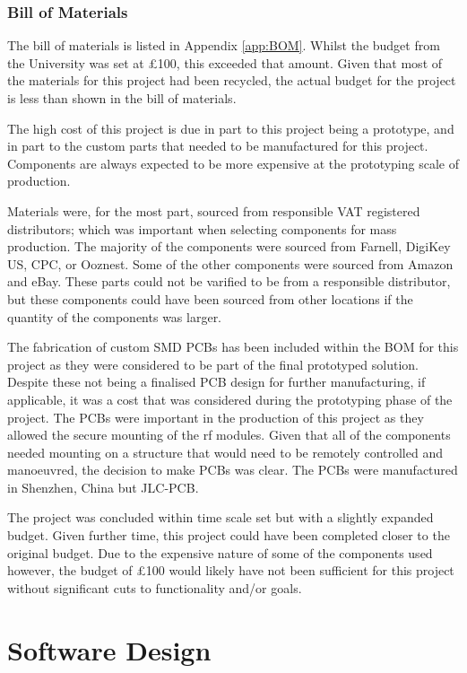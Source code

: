 \documentclass [11pt]{article}
\begin{document}
\subsubsection{Bill of Materials}

The bill of materials is listed in Appendix \ref{app:BOM}. Whilst the budget from the University was set at £100, this exceeded that amount. Given that most of the materials for this project had been recycled, the actual budget for the project is less than shown in the bill of materials.

The high cost of this project is due in part to this project being a prototype, and in part to the custom parts that needed to be manufactured for this project. Components are always expected to be more expensive at the prototyping scale of production.

Materials were, for the most part, sourced from responsible VAT registered distributors; which was important when selecting components for mass production. The majority of the components were sourced from Farnell, DigiKey US, CPC, or Ooznest. Some of the other components were sourced from Amazon and eBay. These parts could not be varified to be from a responsible distributor, but these components could have been sourced from other locations if the quantity of the components was larger. 

The fabrication of custom SMD PCBs has been included within the BOM for this project as they were considered to be part of the final prototyped solution. Despite these not being a finalised PCB design for further manufacturing, if applicable, it was a cost that was considered during the prototyping phase of the project. The PCBs were important in the production of this project as they allowed the secure mounting of the \gls{rf} modules. Given that all of the components needed mounting on a structure that would need to be remotely controlled and manoeuvred, the decision to make PCBs was clear. The PCBs were manufactured in Shenzhen, China but JLC-PCB.

The project was concluded within time scale set but with a slightly expanded budget. Given further time, this project could have been completed closer to the original budget. Due to the expensive nature of some of the components used however, the budget of £100 would likely have not been sufficient for this project without significant cuts to functionality and/or goals.


\section{Software Design}
\end{document}
